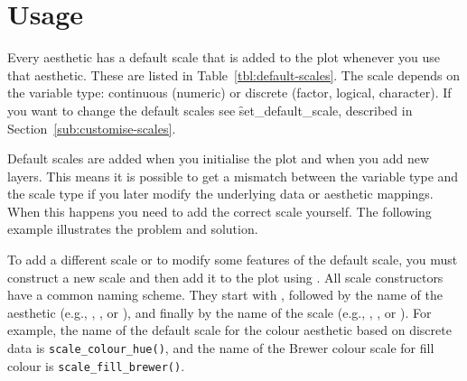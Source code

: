 \section{Usage}
\label{sec:scale-usage}

Every aesthetic has a default scale that is added to the plot whenever you use that aesthetic. These are listed in Table~\ref{tbl:default-scales}. The scale depends on the variable type: continuous (numeric) or discrete (factor, logical, character). If you want to change the default scales see \f{set_default_scale}, described in Section~\ref{sub:customise-scales}. 

Default scales are added when you initialise the plot and when you add new layers. This means it is possible to get a mismatch between the variable type and the scale type if you later modify the underlying data or aesthetic mappings. When this happens you need to add the correct scale yourself. The following example illustrates the problem and solution.

% 
% 
% 


To add a different scale or to modify some features of the default scale, you must construct a new scale and then add it to the plot using \code{+}. All scale constructors have a common naming scheme.  They start with , followed by the name of the aesthetic (e.g., , , or ), and finally by the name of the scale (e.g., , , or ). For example, the name of the default scale for the colour aesthetic based on discrete data is {\tt scale\_colour\_hue()}, and the name of the Brewer colour scale for fill colour is {\tt scale\_fill\_brewer()}.

